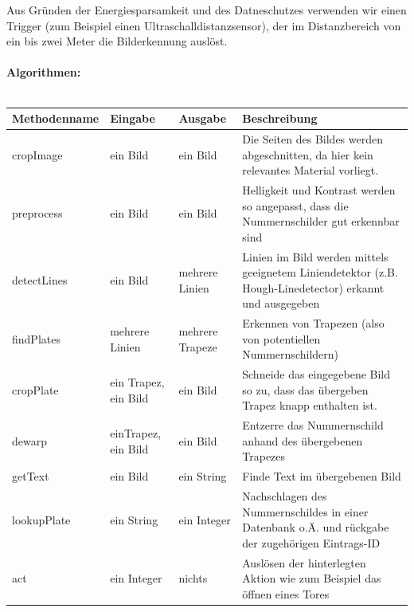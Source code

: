 \documentclass{../Vorlage/sebDenCls}
\begin{document}
Aus Gründen der Energiesparsamkeit und des Datneschutzes verwenden wir einen Trigger (zum Beispiel einen Ultraschalldistanzsensor), der im Distanzbereich von ein bis zwei Meter die Bilderkennung auslöst.\\
\\
\textbf{Algorithmen:}\\\\
\begin{longtable}{lllp{4cm}}
\textbf{Methodenname} & \textbf{Eingabe} & \textbf{Ausgabe} & \textbf{Beschreibung}\\
\hline
cropImage & ein Bild & ein Bild & Die Seiten des Bildes werden abgeschnitten, da hier kein relevantes Material vorliegt.\\\hline
preprocess & ein Bild & ein Bild & Helligkeit und Kontrast werden so angepasst, dass die Nummernschilder gut erkennbar sind\\\hline
detectLines & ein Bild & mehrere Linien & Linien im Bild werden mittels geeignetem Liniendetektor (z.B. Hough-Linedetector) erkannt und ausgegeben\\\hline
findPlates & mehrere Linien & mehrere Trapeze & Erkennen von Trapezen (also von potentiellen Nummernschildern)\\\hline
cropPlate & ein Trapez, ein Bild & ein Bild & Schneide das eingegebene Bild so zu, dass das übergeben Trapez knapp enthalten ist.\\\hline
dewarp & einTrapez, ein Bild & ein Bild & Entzerre das Nummernschild anhand des übergebenen Trapezes\\\hline
getText & ein Bild & ein String & Finde Text im übergebenen Bild\\\hline
lookupPlate & ein String & ein Integer & Nachschlagen des Nummernschildes in einer Datenbank o.Ä. und rückgabe der zugehörigen Eintrags-ID\\\hline
act & ein Integer & nichts & Auslösen der hinterlegten Aktion wie zum Beispiel das öffnen eines Tores\\

\end{longtable}
\end{document}
